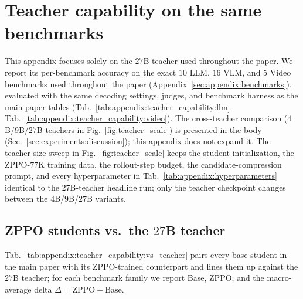 \section{Teacher capability on the same benchmarks}
\label{sec:appendix:teacher_capability}

This appendix focuses solely on the $27$B teacher used throughout the paper. We report its per-benchmark accuracy on the exact $10$ LLM, $16$ VLM, and $5$ Video benchmarks used throughout the paper (Appendix~\ref{sec:appendix:benchmarks}), evaluated with the same decoding settings, judges, and benchmark harness as the main-paper tables (Tab.~\ref{tab:appendix:teacher_capability:llm}--Tab.~\ref{tab:appendix:teacher_capability:video}). The cross-teacher comparison ($4$B/$9$B/$27$B teachers in Fig.~\ref{fig:teacher_scale}) is presented in the body (Sec.~\ref{sec:experiments:discussion}); this appendix does not expand it. The teacher-size sweep in Fig.~\ref{fig:teacher_scale} keeps the student initialization, the ZPPO-$77$K training data, the rollout-step budget, the candidate-compression prompt, and every hyperparameter in Tab.~\ref{tab:appendix:hyperparameters} identical to the $27$B-teacher headline run; only the teacher checkpoint changes between the $4$B/$9$B/$27$B variants.

\subsection{ZPPO students vs.\ the $27$B teacher}
\label{sec:appendix:teacher_capability:vs_teacher}

Tab.~\ref{tab:appendix:teacher_capability:vs_teacher} pairs every base student in the main paper with its ZPPO-trained counterpart and lines them up against the $27$B teacher; for each benchmark family we report Base, ZPPO, and the macro-average delta $\Delta\!=\!\text{ZPPO}\!-\!\text{Base}$.

